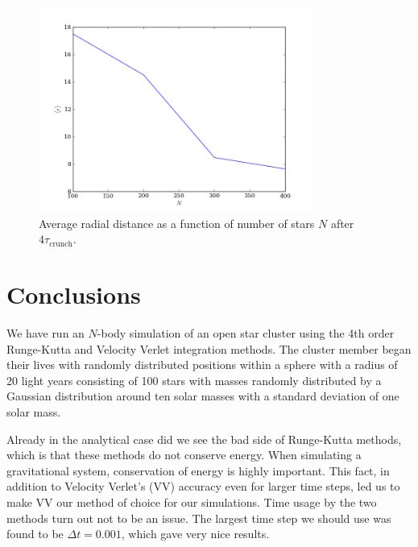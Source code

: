 \documentclass{article}
\begin{document}
\begin{multicols}{2}
\begin{figure}
\begin{center}
  	\includegraphics[width=90mm]{Images/avg_dist.png}
\caption{Average radial distance as a function of number of stars $N$ after $4 \tau_{\mathrm{crunch}}$.}\label{fig:Nbody_avg_dist}
\end{center}
\end{figure}



%
%






\section{Conclusions}\label{sec:conclusion}

We have run an $N$-body simulation of an open star cluster using the 4th order Runge-Kutta and Velocity Verlet integration methods. The cluster member began their lives with randomly distributed positions within a sphere with a radius of 20 light years consisting of 100 stars with masses randomly distributed by a Gaussian distribution around ten solar masses with a standard deviation of one solar mass.

Already in the analytical case did we see the bad side of Runge-Kutta methods, which is that these methods do not conserve energy. When simulating a gravitational system, conservation of energy is highly important. This fact, in addition to Velocity Verlet's (VV) accuracy even for larger time steps, led us to make VV our method of choice for our simulations. Time usage by the two methods turn out not to be an issue. The largest time step we should use was found to be $\Delta t = 0.001$, which gave very nice results.


\end{multicols}
\end{document}
